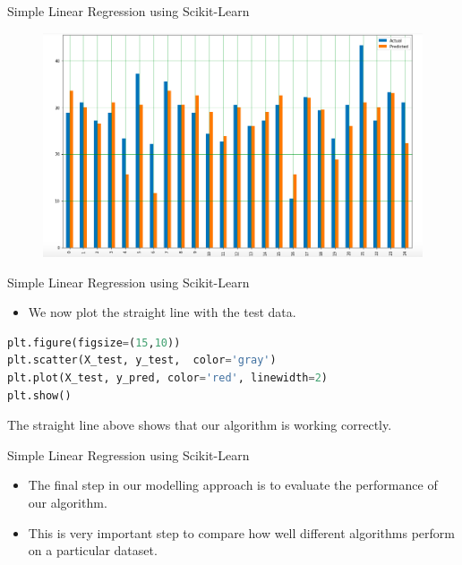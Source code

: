 \documentclass[12pt,xcolor={dvipsnames}]{beamer}
\begin{document}
\begin{frame}{Simple Linear Regression using Scikit-Learn}
\begin{figure}
\centering
\includegraphics[scale=0.3]{LR_Reg7.png}
\end{figure}
\end{frame}

\begin{frame}[fragile]{Simple Linear Regression using Scikit-Learn}
\begin{itemize}
\item We now plot the straight line with the test data.
\end{itemize}
\begin{lstlisting}[language=Python]
plt.figure(figsize=(15,10))
plt.scatter(X_test, y_test,  color='gray')
plt.plot(X_test, y_pred, color='red', linewidth=2)
plt.show()
\end{lstlisting}
The straight line above shows that our algorithm is working correctly.
\end{frame}

\begin{frame}{Simple Linear Regression using Scikit-Learn}
\begin{itemize}
\item The final step in our modelling approach is to evaluate the performance of our algorithm.
\item This is very important step to compare how well different algorithms perform on a particular dataset.
\end{itemize}
\end{frame}
\end{document}

